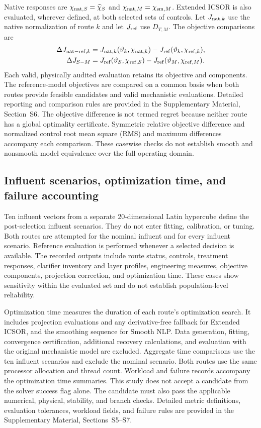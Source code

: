 \documentclass[a4paper,fleqn]{cas-sc}
\begin{document}
Native responses are $\chi_{{\rm nat},S}=\widehat\chi_S$ and $\chi_{{\rm nat},M}=\chi_{{\rm sm},M}$. Extended ICSOR is also evaluated, wherever defined, at both selected sets of controls. Let $J_{{\rm nat},k}$ use the native normalization of route $k$ and let $J_{\rm ref}$ use $D_{T,M}$. The objective comparisons are
\begin{align}
\Delta J_{{\rm nat-ref},k}&=J_{{\rm nat},k}(\vartheta_k,\chi_{{\rm nat},k})-J_{\rm ref}(\vartheta_k,\chi_{{\rm ref},k}),\notag\\
\Delta J_{S-M}&=J_{\rm ref}(\vartheta_S,\chi_{{\rm ref},S})-J_{\rm ref}(\vartheta_M,\chi_{{\rm ref},M}).
\label{eq:comparisons}
\end{align}
Each valid, physically audited evaluation retains its objective and components. The reference-model objectives are compared on a common basis when both routes provide feasible candidates and valid mechanistic evaluations. Detailed reporting and comparison rules are provided in the Supplementary Material, Section~S6. The objective difference is not termed regret because neither route has a global optimality certificate. Symmetric relative objective difference and normalized control root mean square (RMS) and maximum differences accompany each comparison. These casewise checks do not establish smooth and nonsmooth model equivalence over the full operating domain.

\subsection{Influent scenarios, optimization time, and failure accounting}

Ten influent vectors from a separate 20-dimensional Latin hypercube define the post-selection influent scenarios. They do not enter fitting, calibration, or tuning. Both routes are attempted for the nominal influent and for every influent scenario. Reference evaluation is performed whenever a selected decision is available. The recorded outputs include route status, controls, treatment responses, clarifier inventory and layer profiles, engineering measures, objective components, projection correction, and optimization time. These cases show sensitivity within the evaluated set and do not establish population-level reliability.

Optimization time measures the duration of each route's optimization search. It includes projection evaluations and any derivative-free fallback for Extended ICSOR, and the smoothing sequence for Smooth NLP. Data generation, fitting, convergence certification, additional recovery calculations, and evaluation with the original mechanistic model are excluded. Aggregate time comparisons use the ten influent scenarios and exclude the nominal scenario. Both routes use the same processor allocation and thread count. Workload and failure records accompany the optimization time summaries. This study does not accept a candidate from the solver success flag alone. The candidate must also pass the applicable numerical, physical, stability, and branch checks. Detailed metric definitions, evaluation tolerances, workload fields, and failure rules are provided in the Supplementary Material, Sections~S5--S7.
\end{document}
